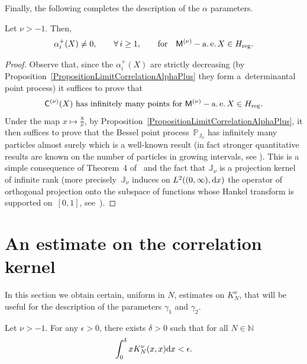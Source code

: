 Finally, the following completes the description of the $\alpha$ parameters.

\begin{Proposition}\label{PropositionAlphaPlus} Let $\nu>-1$. Then,
\begin{gather*}
\alpha_i^+(X)\neq 0, \qquad \forall\, i\ge 1, \qquad \text{for}\quad \mathsf{M}^{(\nu)}-\operatorname{a.e.} X \in H_{{\rm reg}}.
\end{gather*}
\end{Proposition}

\begin{proof}Observe that, since the $\alpha_i^+(X)$ are strictly decreasing (by Proposition~\ref{PropositionLimitCorrelationAlphaPlus} they form a~determinantal point process) it suffices to prove that
\begin{gather*}
\mathsf{C}^{(\nu)}(X)\  \text{has infinitely many points for} \ \mathsf{M}^{(\nu)}-\operatorname{a.e.} X \in H_{{\rm reg}}.
\end{gather*}
Under the map $x \mapsto \frac{8}{x}$, by Proposition~\ref{PropositionLimitCorrelationAlphaPlus}, it then suffices to prove that the Bessel point process~$\mathbb{P}_{\mathbb{J}_{\nu}}$ has infinitely many particles almost surely which is a well-known result (in fact stronger quantitative results are known on the number of particles in growing intervals, see \cite[Theorem~2]{SoshnikovGaussianFluctuations}). This is a simple consequence of Theorem~4 of~\cite{Soshnikov} and the fact that $\mathbb{J}_{\nu}$ is a projection kernel of infinite rank (more precisely~$\mathbb{J}_{\nu}$ induces on $L^2 ((0,\infty),{\rm d}x )$ the operator of orthogonal projection onto the subspace of functions whose Hankel transform is supported on~$[0,1]$, see~\cite{TracyWidom}).
\end{proof}

\section{An estimate on the correlation kernel}\label{section5}
In this section we obtain certain, uniform in $N$, estimates on $K_N^{\nu}$, that will be useful for the description of the parameters $\gamma_1$ and $\gamma_2$.

\begin{Proposition}\label{EstimateGamma1}
Let $\nu>-1$. For any $\epsilon>0$, there exists $\delta>0$ such that for all $N \in \mathbb{N}$
\begin{gather*}
\int_{0}^{\delta}xK^{\nu}_N(x,x){\rm d}x<\epsilon.
\end{gather*}
\end{Proposition}

